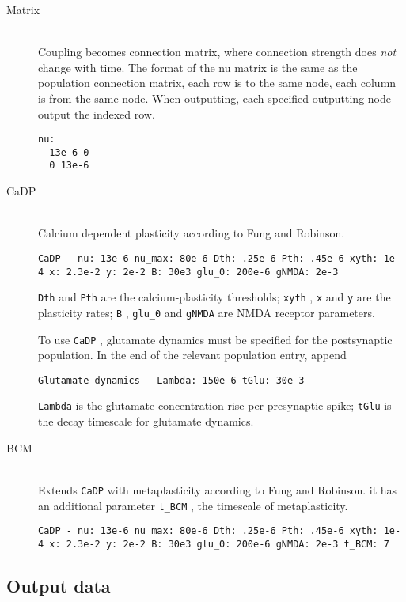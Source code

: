 \documentclass[12pt,a4paper]{article}
\newcommand{\type}[1]{ {\small\small\tt #1} }
\begin{document}
\begin{itemize}
\begin{description}
	\item[Matrix]\ \\
	Coupling becomes connection matrix, where connection strength does \emph{not} change with time. The format of the nu matrix is the same as the population connection matrix, each row is to the same node, each column is from the same node. When outputting, each specified outputting node output the indexed row.
	\begin{lstlisting}
nu:
  13e-6 0
  0 13e-6
	\end{lstlisting}

	\item[CaDP]\ \\
	Calcium dependent plasticity according to Fung and Robinson.
	\begin{lstlisting}
CaDP - nu: 13e-6 nu_max: 80e-6 Dth: .25e-6 Pth: .45e-6 xyth: 1e-4 x: 2.3e-2 y: 2e-2 B: 30e3 glu_0: 200e-6 gNMDA: 2e-3
	\end{lstlisting}

	\type{Dth} and \type{Pth} are the calcium-plasticity thresholds; \type{xyth}, \type{x} and \type{y} are the plasticity rates; \type{B}, \type{glu\_0} and \type{gNMDA} are NMDA receptor parameters.

	To use \type{CaDP}, glutamate dynamics must be specified for the postsynaptic population. In the end of the relevant population entry, append
	\begin{lstlisting}
Glutamate dynamics - Lambda: 150e-6 tGlu: 30e-3
	\end{lstlisting}
	\type{Lambda} is the glutamate concentration rise per presynaptic spike; \type{tGlu} is the decay timescale for glutamate dynamics.

	\item[BCM]\ \\
	Extends \type{CaDP} with metaplasticity according to Fung and Robinson. it has an additional parameter \type{t\_BCM}, the timescale of metaplasticity.
	\begin{lstlisting}
CaDP - nu: 13e-6 nu_max: 80e-6 Dth: .25e-6 Pth: .45e-6 xyth: 1e-4 x: 2.3e-2 y: 2e-2 B: 30e3 glu_0: 200e-6 gNMDA: 2e-3 t_BCM: 7
	\end{lstlisting}

\end{description}
\end{itemize}

\subsection{Output data}
\label{sec:output}
\end{document}

